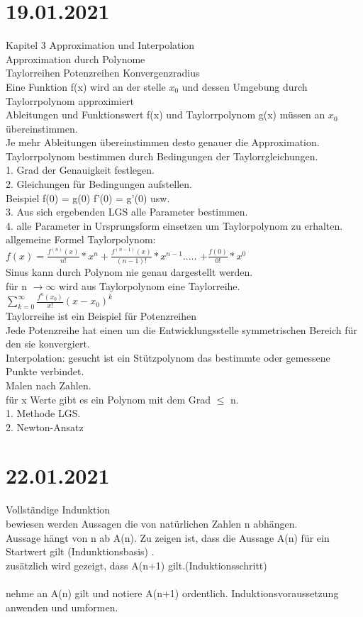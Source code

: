 \documentclass{article}
\begin{document}
	\section*{19.01.2021}
	Kapitel 3 Approximation und Interpolation \\
	Approximation durch Polynome \\
	Taylorreihen Potenzreihen Konvergenzradius \\
	Eine Funktion f(x) wird an der stelle $x_0$ und dessen Umgebung durch Taylorrpolynom approximiert \\
	Ableitungen und Funktionswert f(x) und Taylorrpolynom g(x) müssen an $x_0$ übereinstimmen. \\
	Je mehr Ableitungen übereinstimmen desto genauer die Approximation.
	Taylorrpolynom bestimmen durch Bedingungen der Taylorrgleichungen. \\
	1. Grad der Genauigkeit festlegen. \\
	2. Gleichungen für Bedingungen aufstellen. \\
	Beispiel f(0) = g(0) f'(0) = g'(0) usw. \\
	3. Aus sich ergebenden LGS alle Parameter bestimmen. \\
	4. alle Parameter in Ursprungsform einsetzen um Taylorpolynom zu erhalten. \\
	allgemeine Formel Taylorpolynom: \\
	 $f(x) = \frac{f^{(n)}(x)}{n!} * x^n + \frac{f^{(n-1)}(x)}{(n-1)!}*x^{n-1}$..... $ + \frac{f(0)}{0!}*x^0$ \\
	 Sinus kann durch Polynom nie genau dargestellt werden. \\
	 für n $\to \infty$ wird aus Taylorpolynom eine Taylorreihe. \\
	 $\sum\limits_{k=0}^{\infty} \frac{f^{n}(x_0)}{x!}(x - x_0)^k$ \\
	 Taylorreihe ist ein Beispiel für Potenzreihen \\
	 Jede Potenzreihe hat einen um die Entwicklungsstelle symmetrischen Bereich für den sie konvergiert. \\
	 Interpolation: gesucht ist ein Stützpolynom das bestimmte oder gemessene Punkte verbindet. \\
	 Malen nach Zahlen. \\
	 für x Werte gibt es ein Polynom mit dem Grad $\leq$ n. \\
	 1. Methode LGS. \\
	 2. Newton-Ansatz \\
	 \section*{22.01.2021}
	 Vollständige Indunktion \\
	 bewiesen werden Aussagen die von natürlichen Zahlen n abhängen. \\
	 Aussage hängt von n ab A(n). Zu zeigen ist, dass die Aussage A(n) für ein Startwert gilt (Indunktionsbasis) . \\
	 zusätzlich wird gezeigt, dass A(n+1) gilt.(Induktionsschritt) \\
	 \\
	 nehme an A(n) gilt und notiere A(n+1) ordentlich. Induktionsvoraussetzung anwenden und umformen.
\end{document}
